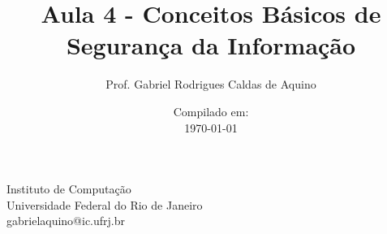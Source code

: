 \title{Aula 4 - Conceitos Básicos de Segurança da Informação}

\author{Prof. Gabriel Rodrigues Caldas de Aquino}

\institute
{
    Instituto de Computação \\
    Universidade Federal do Rio de Janeiro\\
    gabrielaquino@ic.ufrj.br %
}
\date{Compilado em: \\ \today} %



\begin{frame}
    \titlepage
\end{frame}








